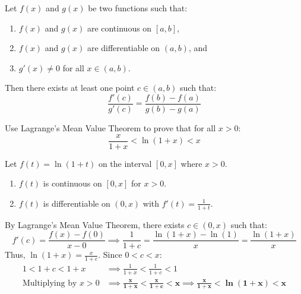 \begin{theorem}
Let $f(x)$ and $g(x)$ be two functions such that:
\begin{enumerate}[leftmargin=1.5em]
    \item $f(x)$ and $g(x)$ are continuous on ${[a,b]}$,
    \item $f(x)$ and $g(x)$ are differentiable on $(a,b)$, and
    \item $g'(x) \ne 0$ for all $x \in (a,b)$.
\end{enumerate}
Then there exists at least one point $c \in (a,b)$ such that:
\begin{equation}
    \frac{f'(c)}{g'(c)} = \frac{f(b) - f(a)}{g(b) - g(a)}
\end{equation}
\end{theorem}

\begin{example}
Use Lagrange's Mean Value Theorem to prove that for all $x > 0$:
\begin{equation*}
    \frac{x}{1+x} < \ln(1+x) < x
\end{equation*}
\end{example}

\begin{solutionbox}
Let $f(t) = \ln(1+t)$ on the interval $[0, x]$ where $x > 0$.
\begin{enumerate}
    \item $f(t)$ is continuous on $[0, x]$ for $x > 0$.
    \item $f(t)$ is differentiable on $(0, x)$ with $f'(t) = \frac{1}{1+t}$.
\end{enumerate}
By Lagrange's Mean Value Theorem, there exists $c \in (0, x)$ such that:
\begin{equation*}
    f'(c) = \frac{f(x) - f(0)}{x - 0} \implies \frac{1}{1+c} = \frac{\ln(1+x) - \ln(1)}{x} = \frac{\ln(1+x)}{x}
\end{equation*}
Thus, $\ln(1+x) = \frac{x}{1+c}$. Since $0 < c < x$:
\begin{align*}
    1 < 1+c < 1+x &\implies \frac{1}{1+x} < \frac{1}{1+c} < 1 \\
    \text{Multiplying by } x > 0 &\implies \mathbf{\frac{x}{1+x} < \frac{x}{1+c} < x} \implies \mathbf{\frac{x}{1+x} < \ln(1+x) < x}
\end{align*}
\end{solutionbox}


